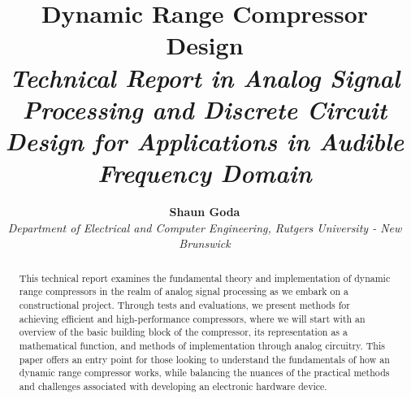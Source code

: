 \documentclass[10pt]{article}
\begin{document}
    \pagestyle{fancy}
    \fancyhf{}
    \renewcommand{\headrulewidth}{0pt}
    \fancypagestyle{firstpage}{
        \fancyhf{}
        \fancyfoot[C]{\footnotesize Page \thepage\ of \pageref{LastPage}}
        \renewcommand{\headrulewidth}{0pt}
    }

    \title{
        \vspace{-5ex}
        \textbf{\huge Dynamic Range Compressor Design}\\
        \textit{Technical Report in Analog Signal Processing and Discrete Circuit Design for Applications in Audible Frequency Domain}
    }

    \author{
        \textbf{\Large Shaun Goda}\\
        \textit{\normalsize Department of Electrical and Computer Engineering, Rutgers University - New Brunswick}
    }

    \date{\vspace{-5ex}} %

    \maketitle

    \thispagestyle{firstpage}

    \begin{abstract}
        This technical report examines the fundamental theory and implementation of dynamic range compressors in the realm of analog signal processing as we embark on a constructional project. Through tests and evaluations, we present methods for achieving efficient and high-performance compressors, where we will start with an overview of the basic building block of the compressor, its representation as a mathematical function, and methods of implementation through analog circuitry. This paper offers an entry point for those looking to understand the fundamentals of how an dynamic range compressor works, while balancing the nuances of the practical methods and challenges associated with developing an electronic hardware device.
    \end{abstract}
    
\end{document}
